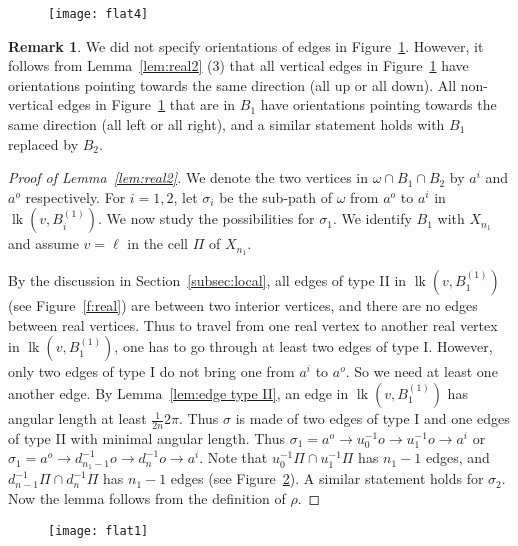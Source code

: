 \documentclass[11pt]{amsart}
\newcommand{\lk}{\operatorname{lk}}
\theoremstyle{definition}
\newtheorem{remark}[theorem]{Remark}
\newcommand{\ui}[1]{u_{#1}^{-1}}
\newcommand{\di}[1]{d_{#1}^{-1}}
\begin{document}
\begin{figure}[h!]
	\centering
	\texttt{[image: flat4]}
	\caption{}
	\label{f:flat4}
\end{figure}

\begin{remark}
	\label{rmk:real2}
We did not specify orientations of edges in Figure~\ref{f:flat4}. However, it follows from Lemma~\ref{lem:real2} (3) that all vertical edges in Figure~\ref{f:flat4} have orientations pointing towards the same direction (all up or all down). All non-vertical edges in Figure~\ref{f:flat4} that are in $B_1$ have orientations pointing towards the same direction (all left or all right), and a similar statement holds with $B_1$ replaced by $B_2$.
\end{remark}

\begin{proof}[Proof of Lemma~\ref{lem:real2}]
We denote the two vertices in $\omega\cap B_1\cap B_2$ by $a^i$ and $a^o$ respectively. For $i=1,2$, let $\sigma_i$ be the sub-path of $\omega$ from $a^o$ to $a^i$ in $\lk(v,B^{(1)}_i)$. We now study the possibilities for $\sigma_1$. We identify $B_1$ with $X_{n_1}$ and assume $v=\ell$ in the cell $\Pi$ of $X_{n_1}$.

By the discussion in Section~\ref{subsec:local}, all edges of type II in $\lk(v,B^{(1)}_1)$ (see Figure~\ref{f:real}) are between two interior vertices, and there are no edges between real vertices. Thus to travel from one real vertex to another real vertex in $\lk(v,B^{(1)}_1)$, one has to go through at least two edges of type I. However, only two edges of type I do not bring one from $a^i$ to $a^o$. So we need at least one another edge. By Lemma~\ref{lem:edge type II}, an edge in $\lk(v,B^{(1)}_1)$ has angular length at least $\frac{1}{2n}2\pi$. Thus $\sigma$ is made of two edges of type I and one edges of type II with minimal angular length. Thus $\sigma_1=a^o\to \ui{0}o\to\ui{1}o\to a^i$ or $\sigma_1=a^o\to \di{n_1-1}o\to\di{n}o\to a^i$. Note that $\ui{0}\Pi\cap\ui{1}\Pi$ has $n_1-1$ edges, and $\di{n-1}\Pi\cap\di{n}\Pi$ has $n_1-1$ edges (see Figure~\ref{f:flat1}). A similar statement holds for $\sigma_2$. Now the lemma follows from the definition of $\rho$.
\end{proof}

\begin{figure}[h!]
	\centering
	\texttt{[image: flat1]}
	\caption{}
	\label{f:flat1}
\end{figure}
\end{document}
